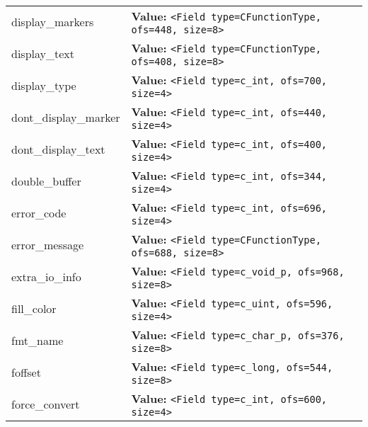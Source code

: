 \begin{longtable}{|p{\varnamewidth}|p{\vardescrwidth}|l}
\cline{1-2}
\raggedright d\-i\-s\-p\-l\-a\-y\-\_\-m\-a\-r\-k\-e\-r\-s\- & \raggedright \textbf{Value:} 
{\tt {\textless}Field type=CFunctionType, ofs=448, size=8{\textgreater}}&\\
\cline{1-2}
\raggedright d\-i\-s\-p\-l\-a\-y\-\_\-t\-e\-x\-t\- & \raggedright \textbf{Value:} 
{\tt {\textless}Field type=CFunctionType, ofs=408, size=8{\textgreater}}&\\
\cline{1-2}
\raggedright d\-i\-s\-p\-l\-a\-y\-\_\-t\-y\-p\-e\- & \raggedright \textbf{Value:} 
{\tt {\textless}Field type=c\_int, ofs=700, size=4{\textgreater}}&\\
\cline{1-2}
\raggedright d\-o\-n\-t\-\_\-d\-i\-s\-p\-l\-a\-y\-\_\-m\-a\-r\-k\-e\-r\- & \raggedright \textbf{Value:} 
{\tt {\textless}Field type=c\_int, ofs=440, size=4{\textgreater}}&\\
\cline{1-2}
\raggedright d\-o\-n\-t\-\_\-d\-i\-s\-p\-l\-a\-y\-\_\-t\-e\-x\-t\- & \raggedright \textbf{Value:} 
{\tt {\textless}Field type=c\_int, ofs=400, size=4{\textgreater}}&\\
\cline{1-2}
\raggedright d\-o\-u\-b\-l\-e\-\_\-b\-u\-f\-f\-e\-r\- & \raggedright \textbf{Value:} 
{\tt {\textless}Field type=c\_int, ofs=344, size=4{\textgreater}}&\\
\cline{1-2}
\raggedright e\-r\-r\-o\-r\-\_\-c\-o\-d\-e\- & \raggedright \textbf{Value:} 
{\tt {\textless}Field type=c\_int, ofs=696, size=4{\textgreater}}&\\
\cline{1-2}
\raggedright e\-r\-r\-o\-r\-\_\-m\-e\-s\-s\-a\-g\-e\- & \raggedright \textbf{Value:} 
{\tt {\textless}Field type=CFunctionType, ofs=688, size=8{\textgreater}}&\\
\cline{1-2}
\raggedright e\-x\-t\-r\-a\-\_\-i\-o\-\_\-i\-n\-f\-o\- & \raggedright \textbf{Value:} 
{\tt {\textless}Field type=c\_void\_p, ofs=968, size=8{\textgreater}}&\\
\cline{1-2}
\raggedright f\-i\-l\-l\-\_\-c\-o\-l\-o\-r\- & \raggedright \textbf{Value:} 
{\tt {\textless}Field type=c\_uint, ofs=596, size=4{\textgreater}}&\\
\cline{1-2}
\raggedright f\-m\-t\-\_\-n\-a\-m\-e\- & \raggedright \textbf{Value:} 
{\tt {\textless}Field type=c\_char\_p, ofs=376, size=8{\textgreater}}&\\
\cline{1-2}
\raggedright f\-o\-f\-f\-s\-e\-t\- & \raggedright \textbf{Value:} 
{\tt {\textless}Field type=c\_long, ofs=544, size=8{\textgreater}}&\\
\cline{1-2}
\raggedright f\-o\-r\-c\-e\-\_\-c\-o\-n\-v\-e\-r\-t\- & \raggedright \textbf{Value:} 
{\tt {\textless}Field type=c\_int, ofs=600, size=4{\textgreater}}&\\

\end{longtable}

